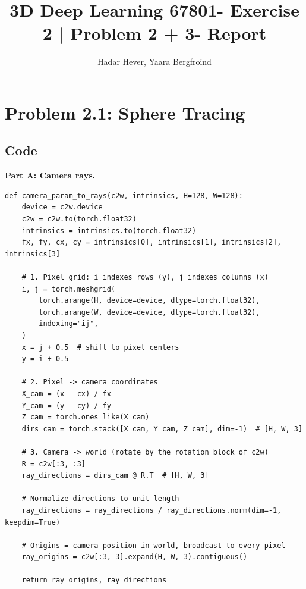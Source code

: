 \documentclass[11pt]{article}
\title{3D Deep Learning 67801- Exercise 2 | Problem 2 + 3- Report}
\author{Hadar Hever, Yaara Bergfroind}
\date{}
\begin{document}
\maketitle

\section{Problem 2.1: Sphere Tracing}

\subsection{Code}

\noindent\textbf{Part A: Camera rays.}
\begin{lstlisting}[style=py]
def camera_param_to_rays(c2w, intrinsics, H=128, W=128):
    device = c2w.device
    c2w = c2w.to(torch.float32)
    intrinsics = intrinsics.to(torch.float32)
    fx, fy, cx, cy = intrinsics[0], intrinsics[1], intrinsics[2], intrinsics[3]

    # 1. Pixel grid: i indexes rows (y), j indexes columns (x)
    i, j = torch.meshgrid(
        torch.arange(H, device=device, dtype=torch.float32),
        torch.arange(W, device=device, dtype=torch.float32),
        indexing="ij",
    )
    x = j + 0.5  # shift to pixel centers
    y = i + 0.5

    # 2. Pixel -> camera coordinates
    X_cam = (x - cx) / fx
    Y_cam = (y - cy) / fy
    Z_cam = torch.ones_like(X_cam)
    dirs_cam = torch.stack([X_cam, Y_cam, Z_cam], dim=-1)  # [H, W, 3]

    # 3. Camera -> world (rotate by the rotation block of c2w)
    R = c2w[:3, :3]
    ray_directions = dirs_cam @ R.T  # [H, W, 3]

    # Normalize directions to unit length
    ray_directions = ray_directions / ray_directions.norm(dim=-1, keepdim=True)

    # Origins = camera position in world, broadcast to every pixel
    ray_origins = c2w[:3, 3].expand(H, W, 3).contiguous()

    return ray_origins, ray_directions
\end{lstlisting}
\end{document}
